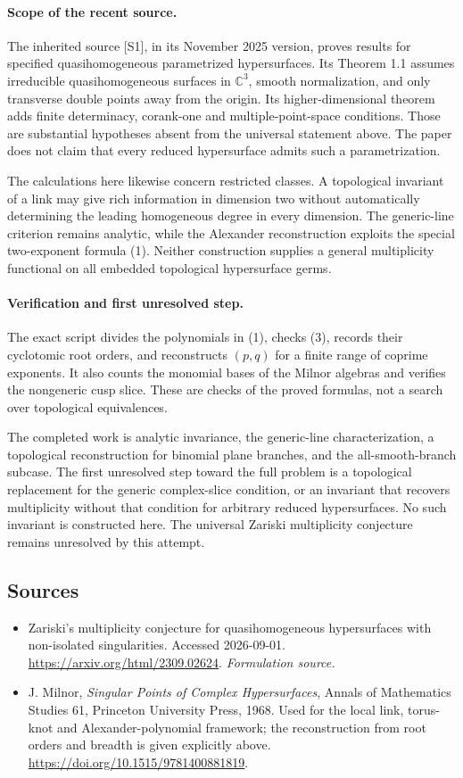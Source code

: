 \documentclass[11pt]{article}
\begin{document}
\paragraph{Scope of the recent source.}
The inherited source [S1], in its November 2025 version, proves results for specified quasihomogeneous parametrized hypersurfaces. Its Theorem 1.1 assumes irreducible quasihomogeneous surfaces in $\mathbb C^3$, smooth normalization, and only transverse double points away from the origin. Its higher-dimensional theorem adds finite determinacy, corank-one and multiple-point-space conditions. Those are substantial hypotheses absent from the universal statement above. The paper does not claim that every reduced hypersurface admits such a parametrization.

The calculations here likewise concern restricted classes. A topological invariant of a link may give rich information in dimension two without automatically determining the leading homogeneous degree in every dimension. The generic-line criterion remains analytic, while the Alexander reconstruction exploits the special two-exponent formula (1). Neither construction supplies a general multiplicity functional on all embedded topological hypersurface germs.

\paragraph{Verification and first unresolved step.}
The exact script divides the polynomials in (1), checks (3), records their cyclotomic root orders, and reconstructs $(p,q)$ for a finite range of coprime exponents. It also counts the monomial bases of the Milnor algebras and verifies the nongeneric cusp slice. These are checks of the proved formulas, not a search over topological equivalences.

The completed work is analytic invariance, the generic-line characterization, a topological reconstruction for binomial plane branches, and the all-smooth-branch subcase. The first unresolved step toward the full problem is a topological replacement for the generic complex-slice condition, or an invariant that recovers multiplicity without that condition for arbitrary reduced hypersurfaces. No such invariant is constructed here. The universal Zariski multiplicity conjecture remains unresolved by this attempt.

\subsection{Sources}
\begin{itemize}
\item[S1]Zariski's multiplicity conjecture for quasihomogeneous hypersurfaces with non-isolated singularities. Accessed 2026-09-01.
\url{https://arxiv.org/html/2309.02624}.
\textit{Formulation source.}
\item[E1]J. Milnor, \textit{Singular Points of Complex Hypersurfaces}, Annals of Mathematics Studies 61, Princeton University Press, 1968. Used for the local link, torus-knot and Alexander-polynomial framework; the reconstruction from root orders and breadth is given explicitly above.
\url{https://doi.org/10.1515/9781400881819}.

\end{itemize}
\end{document}
